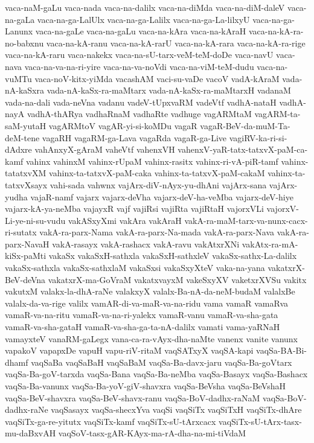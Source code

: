 {vaca-naM-gaLu
vaca-nada
vaca-na-dalilx
vaca-na-diMda
vaca-na-diM-daleV
vaca-na-gaLa
vaca-na-ga-LalUlx
vaca-na-ga-Lalilx
vaca-na-ga-La-lilxyU
vaca-na-ga-Lanunx
vaca-na-gaLe
vaca-na-gaLu
vaca-na-kAra
vaca-na-kAraH
vaca-na-kA-ra-no-babxnu
vaca-na-kA-ranu
vaca-na-kA-rarU
vaca-na-kA-rara
vaca-na-kA-ra-rige
vaca-na-kA-raru
vaca-nakekx
vaca-na-sU-tarx-veM-teM-doDe
vaca-navU
vaca-nava
vaca-na-va-na-ri-yire
vaca-na-va-noVdi
vaca-na-viM-teM-dudu
vaca-na-vuMTu
vaca-noV-kitx-yiMda
vacashAM
vaci-su-vaDe
vacoV
vadA-kAraM
vada-nA-kaSxra
vada-nA-kaSx-ra-maMtarx
vada-nA-kaSx-ra-maMtarxH
vadanaM
vada-na-dali
vada-neVna
vadanu
vadeV-tUpxvaRM
vadeVtf
vadhA-nataH
vadhA-nayA
vadhA-thARya
vadhaRnaM
vadhaRte
vadhuge
vagARMtaM
vagARM-ta-saM-yutaH
vagARMtoV
vagAR-yi-si-koMDu
vagaR
vagaR-BeV-da-muM-Ta-deM-tene
vagaRH
vagaRM-ga-Lava
vagaRda
vagaR-ga-Live
vagiRV-ka-ri-si-dAdxre
vahAnxyX-gAraM
vaheVtf
vahenxVH
vahenxV-yaR-tatx-tatxvX-paM-ca-kamf
vahinx
vahinxM
vahinx-rUpaM
vahinx-rasitx
vahinx-ri-vA-piR-tamf
vahinx-tatatxvXM
vahinx-ta-tatxvX-paM-caka
vahinx-ta-tatxvX-paM-cakaM
vahinx-ta-tatxvXsayx
vahi-sada
vahwnx
vajArx-diV-nAyx-yu-dhAni
vajArx-sana
vajArx-yudha
vajaR-namf
vajarx
vajarx-deVha
vajarx-deV-ha-veMba
vajarx-deV-hiye
vajarx-kA-ya-neMba
vajayxR
vajf
vajiRsi
vajiRta
vajiRtaH
vajorxVLi
vajorxV-Li-ye-ni-su-vudu
vakASxyXmi
vakAra
vakAraH
vakA-ra-maM-tarx-va-nunx-cacx-ri-sutatx
vakA-ra-parx-Nama
vakA-ra-parx-Na-mada
vakA-ra-parx-Nava
vakA-ra-parx-NavaH
vakA-rasayx
vakA-rashacx
vakA-ravu
vakAtxrXNi
vakAtx-ra-mA-kiSx-paMti
vakaSx
vakaSxH-sathxla
vakaSxH-sathxleV
vakaSx-sathx-La-dalilx
vakaSx-sathxla
vakaSx-sathxlaM
vakaSxsi
vakaSxyXteV
vaka-na-yana
vakatxrX-BeV-deVna
vakatxrX-ma-GoVraM
vakatxvayxM
vakeSxyXV
vaketxrXVSu
vakitx
vakutxM
valakx-la-dhA-raNe
valakxyX
valalx-Ba-nA-da-neM-budaM
valalxBe
valalx-da-va-rige
valilx
vamAR-di-va-maR-va-na-ridu
vama
vamaR
vamaRva
vamaR-va-na-ritu
vamaR-va-na-ri-yalekx
vamaR-vanu
vamaR-va-sha-gata
vamaR-va-sha-gataH
vamaR-va-sha-ga-ta-nA-dalilx
vamati
vama-yaRNaH
vamayxteV
vanaRM-gaLegx
vana-ca-ra-vAyx-dha-naMte
vanenx
vanite
vanunx
vapakoV
vapapxDe
vapuH
vapu-riV-ritaM
vaqSATxyX
vaqSA-kapi
vaqSa-BA-Bi-dhamf
vaqSaBa
vaqSaBaH
vaqSaBaM
vaqSa-Ba-davx-jaru
vaqSa-Ba-goVtarx
vaqSa-Ba-goV-tarxda
vaqSa-Bana
vaqSa-Ba-neMba
vaqSa-Basayx
vaqSa-Bashacx
vaqSa-Ba-vanunx
vaqSa-Ba-yoV-giV-shavxra
vaqSa-BeVsha
vaqSa-BeVshaH
vaqSa-BeV-shavxra
vaqSa-BeV-shavx-ranu
vaqSa-BoV-dadhx-raNaM
vaqSa-BoV-dadhx-raNe
vaqSasayx
vaqSa-shecxYva
vaqSi
vaqSiTx
vaqSiTxH
vaqSiTx-dhAre
vaqSiTx-ga-re-yitutx
vaqSiTx-kamf
vaqSiTx-sU-tArxcacx
vaqSiTx-sU-tArx-tasx-mu-daBxvAH
vaqSoV-tasx-gAR-KAyx-ma-rA-dha-na-mi-tiVdaM
}
